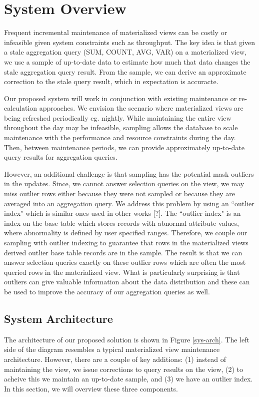 \section{System Overview}
Frequent incremental maintenance of materialized views can be costly or infeasible given system constraints such as throughput.
The key idea is that given a stale aggregation query (SUM, COUNT, AVG, VAR) on a materialized view, we use a sample of up-to-date data to estimate how much that data changes the stale aggregation query result.
From the sample, we can derive an approximate correction to the stale query result, which in expectation is accuracte.

Our proposed system will work in conjunction with existing maintenance or re-calculation approaches.
We envision the scenario where materialized views are being refreshed periodically eg. nightly.
While maintaining the entire view throughout the day may be infeasible, sampling allows the database to scale maintenance with the performance and resource constraints during the day.
Then, between maintenance periods, we can provide approximately up-to-date query results for aggregation queries.

However, an additional challenge is that sampling has the potential mask outliers in the updates.
Since, we cannot answer selection queries on the view, we may miss outlier rows either because they were not sampled or because
they are averaged into an aggregation query.
We address this problem by using an ``outlier index" which is similar ones used in other works [?].
The ``outlier index" is an index on the base table which stores records with abnormal attribute values, where abnormality is defined by user specified ranges.
Therefore, we couple our sampling with outlier indexing to guarantee that rows in the materialized views derived outlier base table records are in the sample.
The result is that we can answer selection queries exactly on these outlier rows which are often the most queried rows in the materialized view.
What is particularly surprising is that outliers can give valuable information about the data distribution and these can be used to improve the accuracy of our aggregation queries as well.

\subsection{System Architecture}
The architecture of our proposed solution is shown in Figure \ref{sys-arch}.
The left side of the diagram resembles a typical materialized 
view maintenance architecture.
However, there are a couple of key additions: (1) instead of maintaining the view,
we issue corrections to query results on the view, (2) to acheive this we maintain
an up-to-date sample, and (3) we have an outlier index.
In this section, we will overview these three components.

